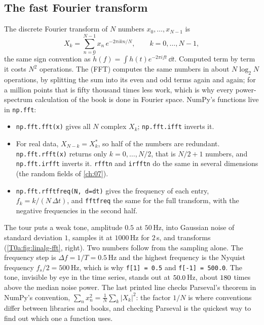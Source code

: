 \subsection{The fast Fourier transform}
\label{T0a:sec:fft}

The discrete Fourier transform of $N$ numbers $x_0,\dots,x_{N-1}$ is
\[
  X_k=\sum_{n=0}^{N-1}x_n\,e^{-2\pi i kn/N},\qquad k=0,\dots,N-1,
\]
the same sign convention as $\tilde h(f)=\int h(t)e^{-2\pi ift}\,\dd t$. Computed term by term it costs $N^2$ operations. The  (FFT) computes the same numbers in about $N\log_2N$ operations, by splitting the sum into its even and odd terms again and again; for a million points that is fifty thousand times less work, which is why every power-spectrum calculation of the book is done in Fourier space. NumPy's functions live in \texttt{np.fft}:
\begin{itemize}[leftmargin=1.5em,itemsep=1pt]
  \item \texttt{np.fft.fft(x)} gives all $N$ complex $X_k$; \texttt{np.fft.ifft} inverts it.
  \item For real data, $X_{N-k}=X_k^*$, so half of the numbers are redundant. \texttt{np.fft.rfft(x)} returns only $k=0,\dots,N/2$, that is $N/2+1$ numbers, and \texttt{np.fft.irfft} inverts it. \texttt{rfftn} and \texttt{irfftn} do the same in several dimensions (the random fields of \cref{ch:07}).
  \item \texttt{np.fft.rfftfreq(N, d=dt)} gives the frequency of each entry, $f_k=k/(N\,\Delta t)$, and \texttt{fftfreq} the same for the full transform, with the negative frequencies in the second half.
\end{itemize}


The tour puts a weak tone, amplitude $0.5$ at $50$\,Hz, into Gaussian noise of standard deviation $1$, samples it at $1000$\,Hz for $2$\,s, and transforms (\cref{T0a:fig:linalg-fft}, right). Two numbers follow from the sampling alone. The frequency step is $\Delta f=1/T=0.5$\,Hz and the highest frequency is the Nyquist frequency $f_s/2=500$\,Hz, which is why \texttt{f[1] = 0.5} and \texttt{f[-1] = 500.0}. The tone, invisible by eye in the time series, stands out at $50.0$\,Hz, about $180$ times above the median noise power. The last printed line checks Parseval's theorem in NumPy's convention, $\sum_n x_n^2=\frac1N\sum_k|X_k|^2$: the factor $1/N$ is where conventions differ between libraries and books, and checking Parseval is the quickest way to find out which one a function uses.

